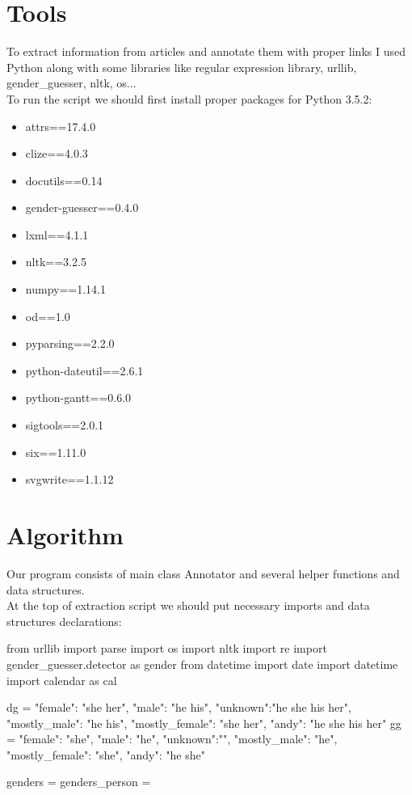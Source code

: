 \documentclass[a4paper]{article}
\begin{document}
\section{Tools}
To extract information from articles and annotate them with proper links I used Python along with some libraries like regular expression library, urllib, gender\_guesser, nltk, os... \\
To run the script we should first install proper packages for Python 3.5.2:
\begin{itemize}
\item attrs==17.4.0
\item clize==4.0.3
\item docutils==0.14
\item gender-guesser==0.4.0
\item lxml==4.1.1
\item nltk==3.2.5
\item numpy==1.14.1
\item od==1.0
\item pyparsing==2.2.0
\item python-dateutil==2.6.1
\item python-gantt==0.6.0
\item sigtools==2.0.1
\item six==1.11.0
\item svgwrite==1.1.12
\end{itemize}	


\section{Algorithm}
Our program consists of main class Annotator and several helper functions and data structures. \\

At the top of extraction script we should put necessary imports and data structures declarations: \\
\begin{python}
from urllib import parse
import os
import nltk
import re
import gender_guesser.detector as gender
from datetime import date
import datetime
import calendar as cal 


dg = {"female": "she her", "male": "he his", "unknown":"he she his her", "mostly_male": "he his", "mostly_female": "she her", "andy": "he she his her"}
gg = {"female": "she", "male": "he", "unknown":"", "mostly_male": "he", "mostly_female": "she", "andy": "he she"}

genders = {}
genders_person = {}
    \end{python}
\end{document}
